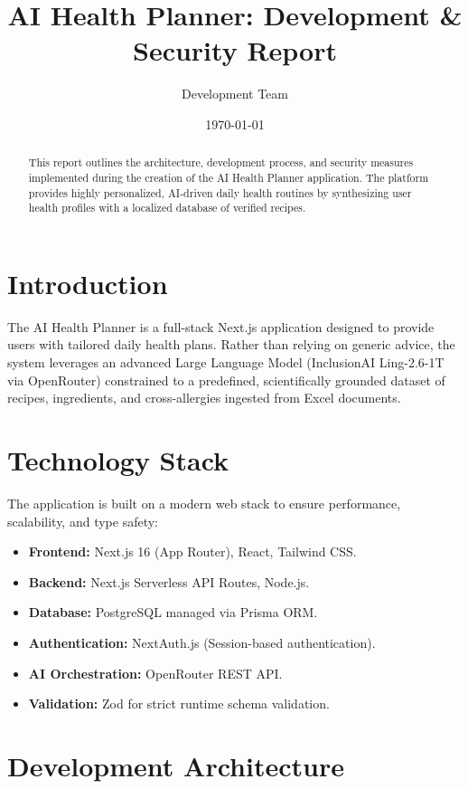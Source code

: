 \documentclass[12pt,a4paper]{article}
\title{\textbf{AI Health Planner: Development \& Security Report}}
\author{Development Team}
\date{\today}
\begin{document}
\maketitle

\begin{abstract}
This report outlines the architecture, development process, and security measures implemented during the creation of the AI Health Planner application. The platform provides highly personalized, AI-driven daily health routines by synthesizing user health profiles with a localized database of verified recipes.
\end{abstract}

\tableofcontents
\newpage

\section{Introduction}
The AI Health Planner is a full-stack Next.js application designed to provide users with tailored daily health plans. Rather than relying on generic advice, the system leverages an advanced Large Language Model (InclusionAI Ling-2.6-1T via OpenRouter) constrained to a predefined, scientifically grounded dataset of recipes, ingredients, and cross-allergies ingested from Excel documents.

\section{Technology Stack}
The application is built on a modern web stack to ensure performance, scalability, and type safety:
\begin{itemize}
    \item \textbf{Frontend:} Next.js 16 (App Router), React, Tailwind CSS.
    \item \textbf{Backend:} Next.js Serverless API Routes, Node.js.
    \item \textbf{Database:} PostgreSQL managed via Prisma ORM.
    \item \textbf{Authentication:} NextAuth.js (Session-based authentication).
    \item \textbf{AI Orchestration:} OpenRouter REST API.
    \item \textbf{Validation:} Zod for strict runtime schema validation.
\end{itemize}

\section{Development Architecture}
\end{document}
